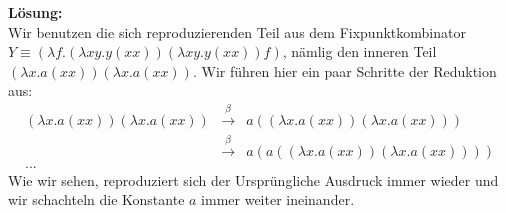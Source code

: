 \documentclass[11pt,a4paper,ngerman]{article}
\begin{document}
\textbf{Lösung:}\\
   Wir benutzen die sich reproduzierenden Teil aus dem Fixpunktkombinator
   $Y \equiv (\lambda f. (\lambda xy.y(xx)) (\lambda xy.y(xx)) f)$, nämlig den inneren
   Teil $(\lambda x.a(xx)) (\lambda x.a(xx))$.
   Wir führen hier ein paar Schritte der Reduktion aus:
   $$\begin{array}{rcl}
      (\lambda x.a(xx)) (\lambda x.a(xx)) &\overset{\beta}{\longrightarrow}&
         a ((\lambda x.a(xx)) (\lambda x.a(xx)))\\
         &\overset{\beta}{\longrightarrow}& a(a((\lambda x.a(xx)) (\lambda x.a(xx))))\\
         ...
   \end{array}$$
   Wie wir sehen, reproduziert sich der Ursprüngliche Ausdruck immer wieder und wir schachteln
   die Konstante $a$ immer weiter ineinander.
\end{document}
